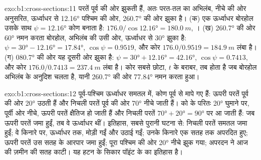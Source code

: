 \begin{solution}{exo:b1:cross-sections:11}
परतें पूर्व की ओर झुकती हैं, अतः परत-तल का अभिलंब, नीचे की ओर अनुसरित, ऊर्ध्वाधर से \ang{12.16} पश्चिम की ओर,
\ang{260.7} की ओर झुका है। (क) एक ऊर्ध्वाधर बोरहोल उसके साथ $\psi = \ang{12.16}$ कोण बनाता है:
$176.0/\cos\ang{12.16} = \qty{180.0}{m}$, । (ख) \ang{260.7} की ओर \ang{60} नमन करता बोरहोल, अभिलंब
की उसी ओर, ऊर्ध्वाधर से \ang{30} झुका है: $\psi = \ang{30} - \ang{12.16} =
\ang{17.84}$, $\cos\psi = 0.9519$, और कोर $176.0/0.9519 =
\qty{184.9}{m}$ लंबा है। (ग) \ang{080.7} की ओर यह दूसरी ओर झुका है: $\psi = \ang{30} + \ang{12.16} = \ang{42.16}$,
$\cos\psi = 0.7413$, और कोर $176.0/0.7413 = \qty{237.4}{m}$ लंबा है। कोर सबसे छोटा, $t$ के बराबर, तब होता है जब
बोरहोल अभिलंब के अनुदिश चलता है, यानी \ang{260.7} की ओर \ang{77.84} नमन करता हुआ।
\end{solution}

\begin{solution}{exo:b1:cross-sections:12}
पूर्व-पश्चिम ऊर्ध्वाधर समतल में, कोण पूर्व से मापे गए हैं: ऊपरी परतें पूर्व की ओर \ang{20} उठती हैं और निचली परतें
पूर्व की ओर \ang{70} नीचे जाती हैं।  को  के परितः \ang{20} घुमाने पर, पूर्वी ओर नीचे, ऊपरी परतें क्षैतिज
हो जाती हैं और निचली परतें $\ang{70} + \ang{20} = \ang{90}$ पर आ जाती हैं: जब ऊपरी परतें जमा हुईं, तब वे ऊर्ध्वाधर
थीं। इतिहास, सबसे पुरानी घटना से: निचली परतें समतल जमा हुईं; वे किनारे पर, ऊर्ध्वाधर तक, मोड़ी गईं और उठाई गईं; उनके
किनारे एक सतह तक अपरदित हुए; ऊपरी परतें उस सतह के आरपार जमा हुईं; पूरा पश्चिम की ओर \ang{20} नीचे झुक गया; अपरदन ने
आज की ज़मीन की सतह काटी। यह हटन के सिकार पॉइंट के  का इतिहास है।
\end{solution}

